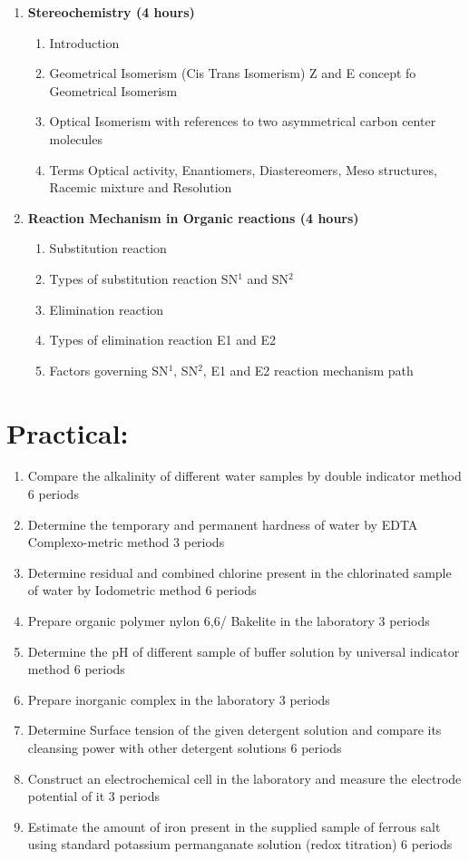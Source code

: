 \begin{enumerate}
    \item \textbf{Stereochemistry \hfill (4 hours)}
    \begin{enumerate}
        \item Introduction
        \item Geometrical Isomerism (Cis Trans Isomerism) Z and E concept fo Geometrical Isomerism
        \item Optical Isomerism with references to two asymmetrical carbon center molecules 
        \item Terms Optical activity, Enantiomers, Diastereomers, Meso structures, Racemic mixture and Resolution
    \end{enumerate}
    
    \item \textbf{Reaction Mechanism in Organic reactions \hfill (4 hours)}
    \begin{enumerate}
        \item Substitution reaction
        \item Types of substitution reaction SN$^1$ and SN$^2$
        \item Elimination reaction
        \item Types of elimination reaction E1 and E2
        \item Factors governing SN$^1$, SN$^2$, E1 and E2 reaction mechanism path
    \end{enumerate}
\end{enumerate}

\section*{Practical:}
\begin{enumerate}
    \item Compare the alkalinity of different water samples by double indicator method \hfill 6 periods
    \item Determine the temporary and permanent hardness of water by EDTA Complexo-metric method \hfill 3 periods
    \item Determine residual and combined chlorine present in the chlorinated sample of water by Iodometric method \hfill 6 periods
    \item Prepare organic polymer nylon 6,6/ Bakelite in the laboratory \hfill 3 periods
    \item Determine the pH of different sample of buffer solution by universal indicator method \hfill 6 periods
    \item Prepare inorganic complex in the laboratory \hfill 3 periods
    \item Determine Surface tension of the given detergent solution and compare its cleansing power with other detergent solutions \hfill 6 periods
    \item Construct an electrochemical cell in the laboratory and measure the electrode potential of it \hfill 3 periods
    \item Estimate the amount of iron present in the supplied sample of ferrous salt using standard potassium permanganate solution (redox titration) \hfill 6 periods
\end{enumerate}


